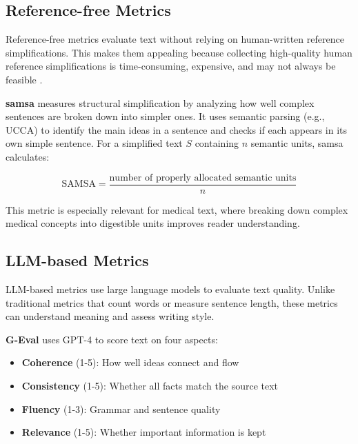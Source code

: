 \subsection{Reference-free Metrics}

Reference-free metrics evaluate text without relying on human-written reference simplifications.
This makes them appealing because collecting high-quality human reference simplifications is time-consuming, expensive, and may not always be feasible \cite{alva-manchego-etal-2021-un, 94205144dd7945cc99b5a6544451b668, deutsch-etal-2022-limitations}.

\textbf{\gls{samsa}} \cite{sulem-etal-2018-semantic} measures structural simplification by analyzing how well complex sentences are broken down into simpler ones. It uses semantic parsing (e.g., UCCA) to identify the main ideas in a sentence and checks if each appears in its own simple sentence. For a simplified text $S$ containing $n$ semantic units, \gls{samsa} calculates:

\begin{equation}
   \text{SAMSA} = \frac{\text{number of properly allocated semantic units}}{n}
\end{equation}

This metric is especially relevant for medical text, where breaking down complex medical concepts into digestible units improves reader understanding.

\subsection{LLM-based Metrics}

LLM-based metrics use large language models to evaluate text quality. 
Unlike traditional metrics that count words or measure sentence length, these metrics can understand meaning and assess writing style.

\textbf{G-Eval} \cite{liu-etal-2023-g} uses GPT-4 to score text on four aspects:

\begin{itemize}
   \item \textbf{Coherence} (1-5): How well ideas connect and flow
   \item \textbf{Consistency} (1-5): Whether all facts match the source text
   \item \textbf{Fluency} (1-3): Grammar and sentence quality 
   \item \textbf{Relevance} (1-5): Whether important information is kept
\end{itemize}

